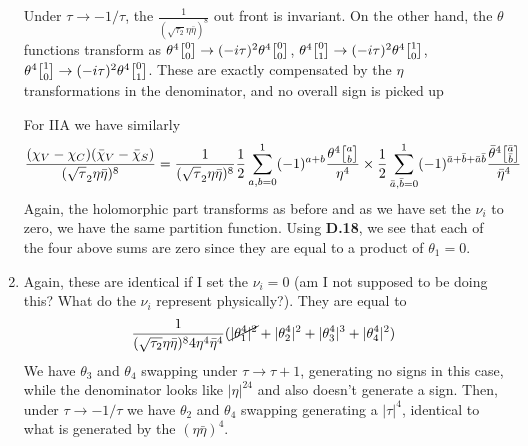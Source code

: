 \documentclass[11pt, class=article, crop=false]{standalone}
\begin{document}
\begin{enumerate}
	Under $\tau \to -1/\tau$, the $\frac1{(\sqrt{\tau_2} \eta \bar \eta)^8}$ out front is invariant. On the other hand, the $\theta$ functions transform as $\theta^4\twist00 \to (-i\tau)^2 \theta^4\twist00$, $\theta^4\twist01 \to (-i\tau)^2 \theta^4\twist10$, $\theta^4\twist10 \to (-i\tau)^2 \theta^4\twist01$. These are exactly compensated by the $\eta$ transformations in the denominator, and no overall sign is picked up
	
	For IIA we have similarly
	\[
		\frac{(\chi_V - \chi_C)(\bar \chi_V - \bar \chi_S)}{(\sqrt \tau_2 \eta \bar \eta)^8} = \frac{1}{(\sqrt \tau_2 \eta \bar \eta)^8} \frac12 \sum_{a,b=0}^1 (-1)^{a+b} \frac{\theta^4\twist{a}{b} }{\eta^4}
		\times \frac12 \sum_{\bar a, \bar b=0}^1 (-1)^{\bar a + \bar b + \bar a \bar b} \frac{\bar \theta^4 \twist{\bar a}{\bar b}}{\bar \eta^4}
	\]
	Again, the holomorphic part transforms as before and as we have set the $\nu_i$ to zero, we have the same partition function. Using \textbf{D.18}, we see that each of the four above sums are zero since they are equal to a product of $\theta_1 = 0$.
	
 	\item Again, these are identical if I set the $\nu_i = 0$ (am I not supposed to be doing this? What do the $\nu_i$ represent physically?). They are equal to
	\[
		\frac{1}{(\sqrt {\tau_2} \eta \bar \eta)^8 4 \eta^4 \bar \eta^4} (\cancel{|\theta_1^4|^2} + |\theta_2^4|^2 + |\theta_3^4|^3 + |\theta_4^4|^2)
	\]
	We have $\theta_3$ and $\theta_4$ swapping under $\tau \to \tau+1$, generating no signs in this case, while the denominator looks like $|\eta|^{24}$ and also doesn't generate a sign. Then, under $\tau \to -1/\tau$ we have $\theta_2$ and $\theta_4$ swapping generating a $|\tau|^4$, identical to what is generated by the $(\eta \bar \eta)^4$. 
	

\end{enumerate}
\end{document}
